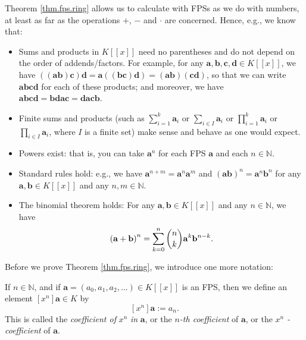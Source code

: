 Theorem \ref{thm.fps.ring} allows us to calculate with FPSs as we do with
numbers, at least as far as the operations $+$, $-$ and $\cdot$ are concerned.
Hence, e.g., we know that:

\begin{itemize}
\item Sums and products in $K\left[  \left[  x\right]  \right]  $ need no
parentheses and do not depend on the order of addends/factors. For example,
for any $\mathbf{a},\mathbf{b},\mathbf{c},\mathbf{d}\in K\left[  \left[
x\right]  \right]  $, we have $\left(  \left(  \mathbf{ab}\right)
\mathbf{c}\right)  \mathbf{d}=\mathbf{a}\left(  \left(  \mathbf{bc}\right)
\mathbf{d}\right)  =\left(  \mathbf{ab}\right)  \left(  \mathbf{cd}\right)  $,
so that we can write $\mathbf{abcd}$ for each of these products; and moreover,
we have $\mathbf{abcd}=\mathbf{bdac}=\mathbf{dacb}$.

\item Finite sums and products (such as $\sum_{i=1}^{k}\mathbf{a}_{i}$ or
$\sum_{i\in I}\mathbf{a}_{i}$ or $\prod_{i=1}^{k}\mathbf{a}_{i}$ or
$\prod_{i\in I}\mathbf{a}_{i}$, where $I$ is a finite set) make sense and
behave as one would expect.

\item Powers exist: that is, you can take $\mathbf{a}^{n}$ for each FPS
$\mathbf{a}$ and each $n\in\mathbb{N}$.

\item Standard rules hold: e.g., we have $\mathbf{a}^{n+m}=\mathbf{a}%
^{n}\mathbf{a}^{m}$ and $\left(  \mathbf{ab}\right)  ^{n}=\mathbf{a}%
^{n}\mathbf{b}^{n}$ for any $\mathbf{a},\mathbf{b}\in K\left[  \left[
x\right]  \right]  $ and any $n,m\in\mathbb{N}$.

\item The binomial theorem holds: For any $\mathbf{a},\mathbf{b}\in K\left[
\left[  x\right]  \right]  $ and any $n\in\mathbb{N}$, we have%
\[
\left(  \mathbf{a}+\mathbf{b}\right)  ^{n}=\sum_{k=0}^{n}\dbinom{n}%
{k}\mathbf{a}^{k}\mathbf{b}^{n-k}.
\]

\end{itemize}

Before we prove Theorem \ref{thm.fps.ring}, we introduce one more notation:

\begin{definition}
\label{def.fps.coeff}If $n\in\mathbb{N}$, and if $\mathbf{a}=\left(
a_{0},a_{1},a_{2},\ldots\right)  \in K\left[  \left[  x\right]  \right]  $ is
an FPS, then we define an element $\left[  x^{n}\right]  \mathbf{a}\in K$ by%
\[
\left[  x^{n}\right]  \mathbf{a}:=a_{n}.
\]
This is called the \emph{coefficient of }$x^{n}$\emph{ in }$\mathbf{a}$, or
the $n$\emph{-th coefficient} of $\mathbf{a}$, or the $x^{n}$%
\emph{-coefficient} of $\mathbf{a}$.
\end{definition}

